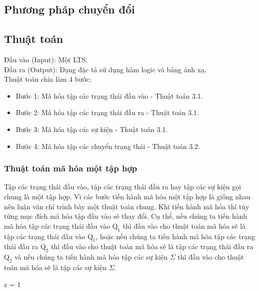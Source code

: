 \documentclass[a4paper,13pt,oneside,openany]{book}
\newenvironment{megaalgorithm}[1][htb]
{\renewcommand{\algorithmcfname}{Thuật toán}%
	\begin{algorithm}[#1]%
}{\end{algorithm}}
\begin{document}
\begin{flushleft}
	\chapter{Phương pháp chuyển đổi}				
		\section{Thuật toán}
		Đầu vào (Input): Một LTS.\\
		Đầu ra (Output): Dạng đặc tả sử dụng hàm logic và bảng ánh xạ.\\
		Thuật toán chia làm 4 bước:
		
		\begin{itemize}
			\item Bước 1: Mã hóa tập các trạng thái đầu vào - Thuật toán 3.1.
			\item Bước 2: Mã hóa tập các trạng thái đầu ra - Thuật toán 3.1.
			\item Bước 3: Mã hóa tập các sự kiện - Thuật toán 3.1.
			\item Bước 4: Mã hóa tập các chuyển trạng thái - Thuật toán 3.2.
		\end{itemize}
		
		\subsection{Thuật toán mã hóa một tập hợp}
		Tập các trạng thái đầu vào, tập các trạng thái đầu ra hay tập các sự kiện gọi chung là một tập hợp. Vì các bước tiến hành mã hóa một tập hợp là giống nhau nên luận văn chỉ trình bày một thuật toán chung. Khi tiến hành mã hóa thì tùy từng mục đích mã hóa tập đầu vào sẽ thay đổi. Cụ thể, nếu chúng ta tiến hành mã hóa tập các trạng thái đầu vào $\textrm{Q}_1$ thì đầu vào cho thuật toán mã hóa sẽ là tập các trạng thái đầu vào $\textrm{Q}_1$, hoặc nếu chúng ta tiến hành mã hõa tập các trạng thái đầu ra $\textrm{Q}_2$ thì đầu vào cho thuật toán mã hóa sẽ là tập các trạng thái đầu ra $\textrm{Q}_2$ và nếu chúng ta tiến hành mã hóa tập các sự kiện $\Sigma$ thì đầu vào cho thuật toán mã hóa sẽ là tập các sự kiện $\Sigma$.\\
		\begin{megaalgorithm}[H]
			\SetAlgoLined
			\DontPrintSemicolon
			
			 {
				z = 1\;
			}


\end{megaalgorithm}
\end{flushleft}
\end{document}
